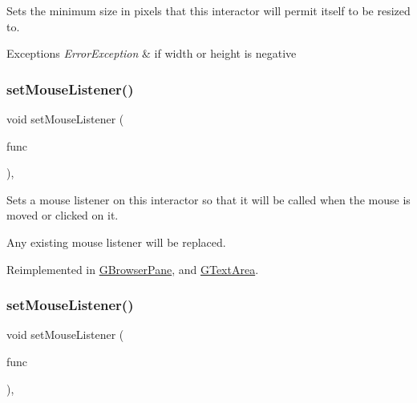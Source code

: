 Sets the minimum size in pixels that this interactor will permit itself to be resized to. 


\begin{DoxyExceptions}{Exceptions}
{\em Error\+Exception} & if width or height is negative \\
\hline
\end{DoxyExceptions}
\mbox{\label{classGInteractor_a37d8dbc943f59920f705b0104f60bde2}} 
\subsubsection{\texorpdfstring{set\+Mouse\+Listener()}{setMouseListener()}\hspace{0.1cm}{\footnotesize\ttfamily [1/2]}}
{\footnotesize\ttfamily void set\+Mouse\+Listener (\begin{DoxyParamCaption}\item[{G\+Event\+Listener}]{func }\end{DoxyParamCaption})\hspace{0.3cm}{\ttfamily [virtual]}, {\ttfamily [inherited]}}



Sets a mouse listener on this interactor so that it will be called when the mouse is moved or clicked on it. 

Any existing mouse listener will be replaced. 

Reimplemented in \mbox{\hyperlink{classGBrowserPane_a2c6a3746da7ffa3819294896d4423059}{G\+Browser\+Pane}}, and \mbox{\hyperlink{classGTextArea_a2c6a3746da7ffa3819294896d4423059}{G\+Text\+Area}}.

\mbox{\label{classGInteractor_aea7f647ea62d59f71b5fad6aa65eeaf9}} 
\subsubsection{\texorpdfstring{set\+Mouse\+Listener()}{setMouseListener()}\hspace{0.1cm}{\footnotesize\ttfamily [2/2]}}
{\footnotesize\ttfamily void set\+Mouse\+Listener (\begin{DoxyParamCaption}\item[{G\+Event\+Listener\+Void}]{func }\end{DoxyParamCaption})\hspace{0.3cm}{\ttfamily [virtual]}, {\ttfamily [inherited]}}



